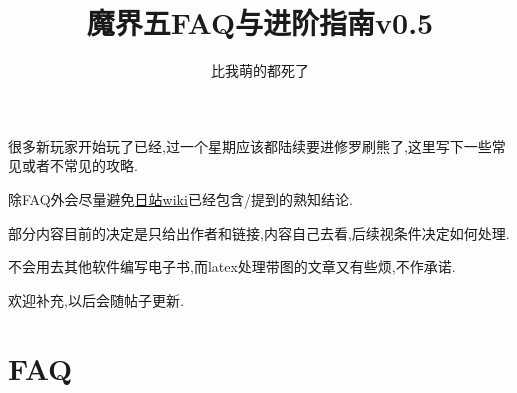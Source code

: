 




\title{魔界五FAQ与进阶指南v0.5}
\author{比我萌的都死了}

\maketitle

很多新玩家开始玩了已经,过一个星期应该都陆续要进修罗刷熊了,这里写下一些常见或者不常见的攻略.

{\color{red}{本文建立在有魔女DLC和暴君DLC的基础之上,几十块钱和几十小时时间自己选.}}

除FAQ外会尽量避免\href{http://wikinavi.net/disgaea5/index.php}{日站wiki}已经包含/提到的熟知结论.

部分内容目前的决定是只给出作者和链接,内容自己去看,后续视条件决定如何处理.

不会用去其他软件编写电子书,而latex处理带图的文章又有些烦,不作承诺.

欢迎补充,以后会随帖子更新.

\newpage
\tableofcontents
\newpage



\newpage

\section{FAQ}

